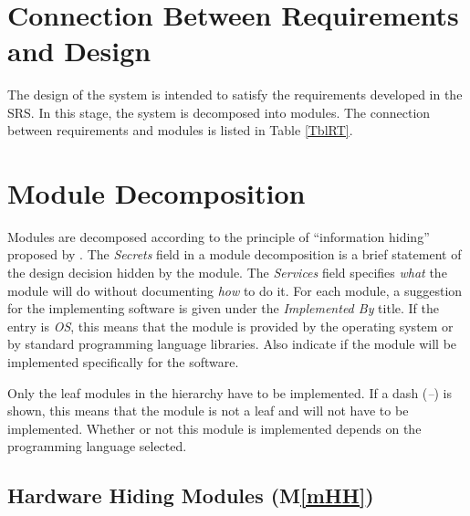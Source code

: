 \documentclass[12pt, titlepage]{article}
\newcommand{\mref}[1]{M\ref{#1}}
\begin{document}
	\\
	\section{Connection Between Requirements and Design} \label{SecConnection}
	
	The design of the system is intended to satisfy the requirements developed in
	the SRS. In this stage, the system is decomposed into modules. The connection
	between requirements and modules is listed in Table \ref{TblRT}.
	
	\section{Module Decomposition} \label{SecMD}
	
	Modules are decomposed according to the principle of ``information hiding''
	proposed by \citet{ParnasEtAl1984}. The \emph{Secrets} field in a module
	decomposition is a brief statement of the design decision hidden by the
	module. The \emph{Services} field specifies \emph{what} the module will do
	without documenting \emph{how} to do it. For each module, a suggestion for the
	implementing software is given under the \emph{Implemented By} title. If the
	entry is \emph{OS}, this means that the module is provided by the operating
	system or by standard programming language libraries.  Also indicate if the
	module will be implemented specifically for the software.
	
	Only the leaf modules in the
	hierarchy have to be implemented. If a dash (\emph{--}) is shown, this means
	that the module is not a leaf and will not have to be implemented. Whether or
	not this module is implemented depends on the programming language
	selected.
	
	\subsection{Hardware Hiding Modules (\mref{mHH})}
	
\end{document}
